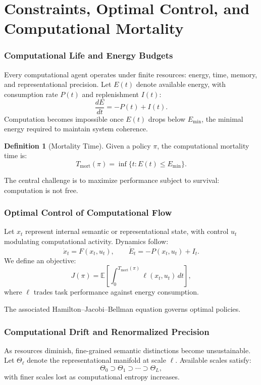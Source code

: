 \documentclass[12pt]{article}
\theoremstyle{plain}
\theoremstyle{definition}
\newtheorem{definition}[theorem]{Definition}
\theoremstyle{remark}
\begin{document}
\part{Constraints, Optimal Control, and Computational Mortality}

\section{Computational Life and Energy Budgets}

Every computational agent operates under finite resources: energy, time,
memory, and representational precision. Let $E(t)$ denote available energy,
with consumption rate $P(t)$ and replenishment $I(t)$:
\[
\frac{dE}{dt} = -P(t) + I(t).
\]
Computation becomes impossible once $E(t)$ drops below $E_{\mathrm{min}}$,
the minimal energy required to maintain system coherence.

\begin{definition}[Mortality Time]
Given a policy $\pi$, the computational mortality time is:
\[
T_{\mathrm{mort}}(\pi)
= \inf\{ t : E(t) \le E_{\mathrm{min}} \}.
\]
\end{definition}

The central challenge is to maximize performance subject to survival: 
computation is not free.

\section{Optimal Control of Computational Flow}

Let $x_t$ represent internal semantic or representational state, with control 
$u_t$ modulating computational activity. Dynamics follow:
\[
\dot{x}_t = F(x_t,u_t),
\qquad
\dot{E}_t = -P(x_t,u_t) + I_t.
\]
We define an objective:
\[
J(\pi)
= \mathbb{E}\left[
    \int_0^{T_{\mathrm{mort}}(\pi)}
       \ell(x_t,u_t)\, dt
  \right],
\]
where $\ell$ trades task performance against energy consumption.

The associated Hamilton–Jacobi–Bellman equation 
\citep{bertsekas2005dynamic, khalil2002nonlinear} governs optimal policies.

\section{Computational Drift and Renormalized Precision}

As resources diminish, fine-grained semantic distinctions become unsustainable.
Let $\Theta_\ell$ denote the representational manifold at scale $\ell$.
Available scales satisfy:
\[
\Theta_0 \supset \Theta_1 \supset \cdots \supset \Theta_L,
\]
with finer scales lost as computational entropy increases.
\end{document}
